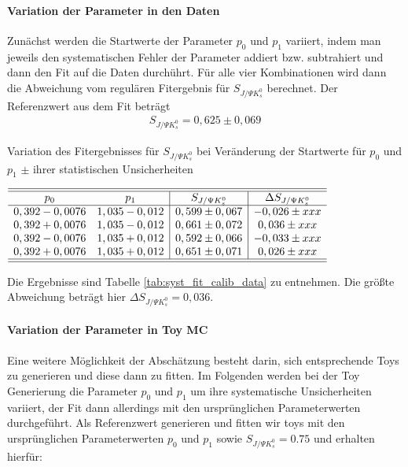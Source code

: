 \documentclass[a4paper]{scrbook}
\newcommand{\SJPsi}{S_{J/\Psi K_s^0}}
\begin{document}
\paragraph{Variation der Parameter in den Daten}
Zunächst werden die Startwerte der Parameter $p_0$ und $p_1$ variiert, indem man jeweils den systematischen Fehler der Parameter addiert bzw. subtrahiert und dann den Fit auf die Daten durchührt. Für alle vier Kombinationen wird dann die Abweichung vom regulären Fitergebnis für $\SJPsi$ berechnet. Der Referenzwert aus dem Fit beträgt
\begin{align}
\SJPsi = 0,625 \pm 0,069
\end{align}

\begin{table}[hptb]
\centering
\caption{Variation des Fitergebnisses für $\SJPsi$ bei Veränderung der Startwerte für $p_0$ und $p_1$ $\pm$ ihrer statistischen Unsicherheiten}
\label{tab:syst_fit_calib_data}
$\begin{array}{cc|c|c}
\hline\hline
p_0            & p_1           & \SJPsi          & \Delta\SJPsi   \\ \hline
0,392 - 0,0076 & 1,035 - 0,012 & 0,599 \pm 0,067 & -0,026 \pm xxx \\
0,392 + 0,0076 & 1,035 - 0,012 & 0,661 \pm 0,072 & 0,036 \pm xxx \\
0,392 - 0,0076 & 1,035 + 0,012 & 0,592 \pm 0,066 & -0,033 \pm xxx \\
0,392 + 0,0076 & 1,035 + 0,012 & 0,651 \pm 0,071 & 0,026 \pm xxx \\
\hline\hline
\end{array}$
\end{table}

Die Ergebnisse sind Tabelle \ref{tab:syst_fit_calib_data} zu entnehmen. Die größte Abweichung beträgt hier $\Delta\SJPsi = 0,036$.

\paragraph{Variation der Parameter in \gls{Toy MC}}
Eine weitere Möglichkeit der Abschätzung besteht darin, sich entsprechende Toys zu generieren und diese dann zu fitten. Im Folgenden werden bei der Toy Generierung die Parameter $p_0$ und $p_1$ um ihre systematische Unsicherheiten variiert, der Fit dann allerdings mit den ursprünglichen Parameterwerten durchgeführt. Als Referenzwert generieren und fitten wir toys mit den ursprünglichen Parameterwerten $p_0$ und $p_1$ sowie $\SJPsi = 0.75$ und erhalten hierfür:
\end{document}

